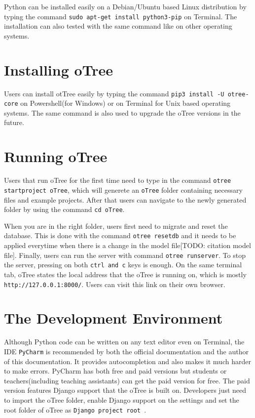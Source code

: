 \begin{appendix}
Python can be installed easily on a Debian/Ubuntu based Linux distribution by typing the command \verb|sudo apt-get install python3-pip| on Terminal. The installation can also tested with the same command like on other operating systems.

\section{Installing oTree}

Users can install otTree easily by typing the command \verb|pip3 install -U otree-core| on Powershell(for Windows) or on Terminal for Unix based operating systems. The same command is also used to upgrade the oTree versions in the future.

\section{Running oTree}

Users that run oTree for the first time need to type in the command \verb|otree startproject oTree|, which will generete an \verb|oTree| folder containing necessary files and example projects. After that users can navigate to the newly generated folder by using the command \verb|cd oTree|. 

When you are in the right folder, users first need to migrate and reset the database. This is done with the command \verb|otree resetdb| and it needs to be applied everytime when there is a change in the model file[TODO: citation model file]. Finally, users can run the server with command \verb|otree runserver|. To stop the server, pressing on both \verb|ctrl and c| keys is enough. On the same terminal tab, oTree states the local address that the oTree is running on, which is mostly \verb|http://127.0.0.1:8000/|. Users can visit this link on their own browser.

\section{The Development Environment}

Although Python code can be written on any text editor even on Terminal, the IDE \verb|PyCharm| is recommended by both the official documentation and the author of this documentation. It provides autocompletion and also makes it much harder to make errors. PyCharm has both free and paid versions but students or teachers(including teaching assistants) can get the paid version for free. The paid version features Django support that the oTree is built on. Developers just need to import the oTree folder, enable Django support on the settings and set the root folder of oTree as \verb|Django project root |. 


\end{appendix}
